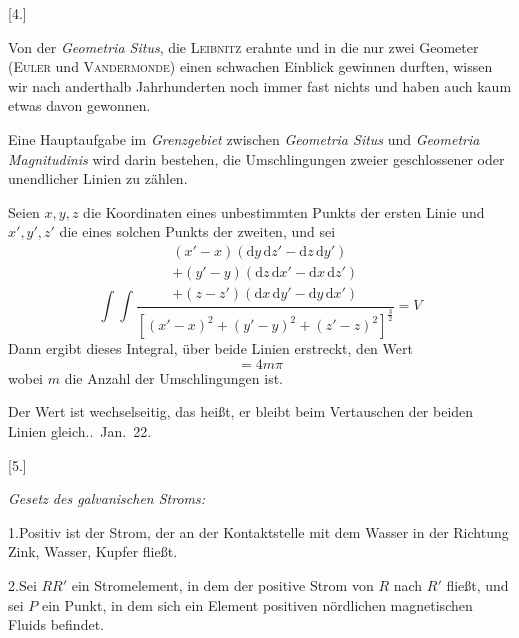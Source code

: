 \begin{center}[4.]\end{center}
Von der \textit{Geometria Situs}, die \textsc{Leibnitz} erahnte und in die nur zwei Geometer (\textsc{Euler} und \textsc{Vandermonde}) einen schwachen Einblick gewinnen durften, wissen wir nach anderthalb Jahrhunderten noch immer fast nichts und haben auch kaum etwas davon gewonnen.

Eine Hauptaufgabe im \textit{Grenzgebiet} zwischen \textit{Geometria Situs} und \textit{Geometria Magnitudinis} wird darin bestehen, die Umschlingungen zweier geschlossener oder unendlicher Linien zu zählen.

Seien $x,y,z$ die Koordinaten eines unbestimmten Punkts der ersten Linie und $x',y',z'$ die eines solchen Punkts der zweiten, und sei
\[
\int\int\frac{\begin{gathered}
(x'-x)(\mathrm dy\,\mathrm dz'-\mathrm dz\,\mathrm dy')\\
+(y'-y)(\mathrm dz\,\mathrm dx'-\mathrm dx\,\mathrm dz')\\
+(z-z')(\mathrm dx\,\mathrm dy'-\mathrm dy\,\mathrm dx')
\end{gathered}}{[(x'-x)^2+(y'-y)^2+(z'-z)^2]^{\frac{3}{2}}}=V
\]
Dann ergibt dieses Integral, über beide Linien erstreckt, den Wert
\[
=4m\pi
\]
wobei $m$ die Anzahl der Umschlingungen ist.

Der Wert ist wechselseitig, das heißt, er bleibt beim Vertauschen der beiden Linien gleich..\ Jan.\ 22.

\begin{center}[5.]\par\medskip\textit{Gesetz des galvanischen Stroms:}\end{center}
1.\quad Positiv ist der Strom, der an der Kontaktstelle mit dem Wasser in der Richtung Zink, Wasser, Kupfer fließt.

2.\quad Sei $RR'$ ein Stromelement, in dem der positive Strom von $R$ nach $R'$ fließt, und sei $P$ ein Punkt, in dem sich ein Element positiven nördlichen magnetischen Fluids befindet.

